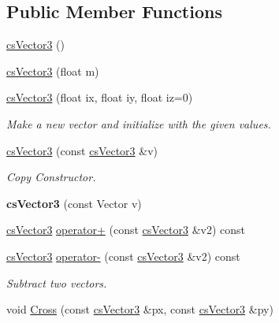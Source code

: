 \subsection*{Public Member Functions}
\begin{DoxyCompactItemize}
\item 
\hyperlink{classcsVector3_a27d80c7e6bcdaee093012aa843492ca6}{cs\+Vector3} ()
\item 
\hyperlink{classcsVector3_a0267a154da795520aa74c4861ab36d77}{cs\+Vector3} (float m)
\item 
\hyperlink{classcsVector3_a5c187c254a4d44d364670ff9e57b59a5}{cs\+Vector3} (float ix, float iy, float iz=0)\hypertarget{classcsVector3_a5c187c254a4d44d364670ff9e57b59a5}{}\label{classcsVector3_a5c187c254a4d44d364670ff9e57b59a5}

\begin{DoxyCompactList}\small\item\em Make a new vector and initialize with the given values. \end{DoxyCompactList}\item 
\hyperlink{classcsVector3_a83e55d80b89992b33983461997aaf3f0}{cs\+Vector3} (const \hyperlink{classcsVector3}{cs\+Vector3} \&v)\hypertarget{classcsVector3_a83e55d80b89992b33983461997aaf3f0}{}\label{classcsVector3_a83e55d80b89992b33983461997aaf3f0}

\begin{DoxyCompactList}\small\item\em Copy Constructor. \end{DoxyCompactList}\item 
{\bfseries cs\+Vector3} (const Vector v)\hypertarget{classcsVector3_a101337ee894cace1bf624a249afd1c72}{}\label{classcsVector3_a101337ee894cace1bf624a249afd1c72}

\item 
\hyperlink{classcsVector3}{cs\+Vector3} \hyperlink{classcsVector3_a75181b739e17421a621bfc557684368c}{operator+} (const \hyperlink{classcsVector3}{cs\+Vector3} \&v2) const 
\item 
\hyperlink{classcsVector3}{cs\+Vector3} \hyperlink{classcsVector3_af6366d1a3e08a496563ff72305d22f4c}{operator-\/} (const \hyperlink{classcsVector3}{cs\+Vector3} \&v2) const \hypertarget{classcsVector3_af6366d1a3e08a496563ff72305d22f4c}{}\label{classcsVector3_af6366d1a3e08a496563ff72305d22f4c}

\begin{DoxyCompactList}\small\item\em Subtract two vectors. \end{DoxyCompactList}\item 
void \hyperlink{classcsVector3_a6da3afcc16d51f5cbb122786530abfc8}{Cross} (const \hyperlink{classcsVector3}{cs\+Vector3} \&px, const \hyperlink{classcsVector3}{cs\+Vector3} \&py)\hypertarget{classcsVector3_a6da3afcc16d51f5cbb122786530abfc8}{}\label{classcsVector3_a6da3afcc16d51f5cbb122786530abfc8}


\end{DoxyCompactItemize}

